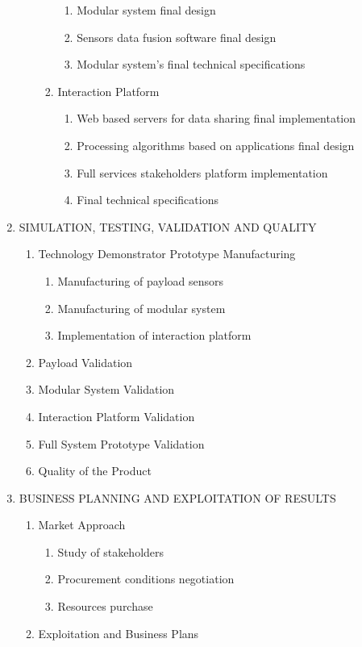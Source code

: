 \begin{enumerate}[label*=\arabic*.]
\begin{enumerate}[label*=\arabic*.]
\begin{enumerate}[label*=\arabic*.]
			\begin{enumerate}[label*=\arabic*.]
				\item Modular system final design
				\item Sensors data fusion software final design
				\item Modular system's final technical specifications
			\end{enumerate}
			\item Interaction Platform
			\begin{enumerate}[label*=\arabic*.]
				\item Web based servers for data sharing final implementation
				\item Processing algorithms based on applications final design
				\item Full services stakeholders platform implementation
				\item Final technical specifications
			\end{enumerate}
		\end{enumerate}
	\end{enumerate}
	
	\item SIMULATION, TESTING, VALIDATION AND QUALITY
	
	\begin{enumerate}[label*=\arabic*.]
		\item Technology Demonstrator Prototype Manufacturing
		\begin{enumerate}[label*=\arabic*.]
			\item Manufacturing of payload sensors
			\item Manufacturing of modular system
			\item Implementation of interaction platform
		\end{enumerate}
		\item Payload Validation
		\item Modular System Validation
		\item Interaction Platform Validation
		\item Full System Prototype Validation
		\item Quality of the Product
	\end{enumerate}
	
	\item BUSINESS PLANNING AND EXPLOITATION OF RESULTS
	
	\begin{enumerate}[label*=\arabic*.]
		\item Market Approach
		\begin{enumerate}[label*=\arabic*.]
			\item Study of stakeholders
			\item Procurement conditions negotiation
			\item Resources purchase	
		\end{enumerate}
		\item Exploitation and Business Plans
	\end{enumerate}
	

\end{enumerate}
